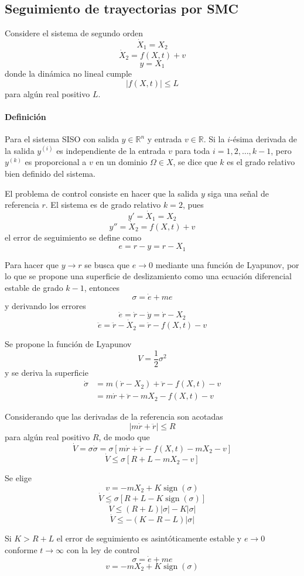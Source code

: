 \begin{flushright}
\end{flushright}

\subsection{Seguimiento de trayectorias por SMC}

Considere el sistema de segundo orden
\[
  \dot{X}_1=X_2
\]
\[
  \dot{X}_2=f(X,t)+v
\]
\[
  y=X_1
\]
donde la dinámica no lineal cumple
\[
  \lvert f(X,t)\rvert\leq L
\]
para algún real positivo $L$.

\paragraph{Definición}
Para el sistema SISO con salida $y\in\mathbb{R}^{n}$ y entrada
$v\in\mathbb{R}$. Si la $i$-ésima derivada de la salida $y^{(i)}$ es
independiente de la entrada $v$ para toda $i=1,2,\ldots,k-1$, pero $y^{(k)}$
es proporcional a $v$ en un dominio $\Omega\in X$, se dice que $k$ es el
grado relativo bien definido del sistema.

El problema de control consiste en hacer que la salida $y$ siga una señal de
referencia $r$. El sistema es de grado relativo $k=2$, pues
\[
  y'=\dot{X}_1=X_2
\]
\[
  y''=\dot{X}_2=f(X,t)+v
\]
el error de seguimiento se define como
\[
  e=r-y=r-X_1
\]

Para hacer que $y\to r$ se busca que $e\to0$ mediante una función de
Lyapunov, por lo que se propone una superficie de deslizamiento como una
ecuación diferencial estable de grado $k-1$, entonces
\[
  \sigma=\dot{e}+me
\]
y derivando los errores
\[
  \dot{e}=\dot{r}-\dot{y}=\dot{r}-X_2
\]
\[
  \ddot{e}=\ddot{r}-\dot{X}_2
  =\ddot{r}-f(X,t)-v
\]

Se propone la función de Lyapunov
\[
  V=\frac{1}{2}\sigma^2
\]
y se deriva la superficie
\begin{align*}
  \dot{\sigma}
  &=m(\dot{r}-X_2)+\ddot{r}-f(X,t)-v\\
  &=m\dot{r}+\ddot{r}-mX_2-f(X,t)-v
\end{align*}

Considerando que las derivadas de la referencia son acotadas
\[
  \lvert m\dot{r}+\ddot{r}\rvert\leq R
\]
para algún real positivo $R$, de modo que
\[
  \dot{V}=\sigma\dot{\sigma}
  =\sigma\left[m\dot{r}+\ddot{r}-f(X,t)-mX_2-v\right]
\]
\[
  \dot{V}\leq\sigma\left[R+L-mX_2-v\right]
\]

Se elige
\[
  v=-mX_2+K\operatorname{sign}(\sigma)
\]
\[
  \dot{V}\leq\sigma\left[R+L-K\operatorname{sign}(\sigma)\right]
\]
\[
  \dot{V}\leq(R+L)\lvert\sigma\rvert-K\lvert\sigma\rvert
\]
\[
  \dot{V}\leq-(K-R-L)\lvert\sigma\rvert
\]

Si $K>R+L$ el error de seguimiento es asintóticamente estable y $e\to0$
conforme $t\to\infty$ con la ley de control
\[
  \sigma=\dot{e}+me
\]
\[
  v=-mX_2+K\operatorname{sign}(\sigma)
\]